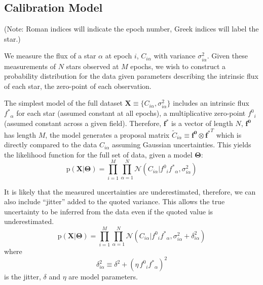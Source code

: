 \documentclass[12pt,preprint]{aastex}
\newcommand{\eqlabel}[1]{\label{eq:#1}}
\newcommand{\paramvector}[1]{\boldsymbol{#1}}
\newcommand{\bvec}[1]{\paramvector{#1}}
\newcommand{\normal}[3]{\mathcal{N} (#1 | #2, #3)}
\renewcommand{\Pr}{\mathrm{p}}
\newcommand{\model}     {\ensuremath{\paramvector{\Theta}} }
\newcommand{\data}      {\ensuremath{\mathbf{X}} }
\newcommand{\fstar}     {\ensuremath{f^*} }
\newcommand{\fzero}     {\ensuremath{f^0}}
\newcommand{\jabs}      {\ensuremath{\delta} }
\newcommand{\jrel}      {\ensuremath{\eta} }
\newcommand{\jitter}[1] {\ensuremath{\delta_{#1}^2} }
\begin{document}

\subsection{Calibration Model}

(Note: Roman indices will indicate the epoch number, Greek indices will
label the star.)

We measure the flux of a star $\alpha$ at epoch $i$, $C_{i\alpha}$ with
variance $\sigma_{i\alpha}^2$.  Given these measurements of $N$ stars observed
at $M$ epochs, we wish to construct a probability distribution for the data given
parameters describing the intrinsic flux of each star, the zero-point of each
observation.


The simplest model of the full dataset $\data \equiv \{ C_{i\alpha},
\sigma^2_{i\alpha} \}$ includes an intrinsic flux $\fstar_\alpha$ for
each star (assumed constant at all epochs), a multiplicative zero-point
$\fzero_i$ (assumed constant across a given field).  Therefore,
$\bvec{\fstar}$ is a vector of length $N$, $\bvec{\fzero}$ has
length $M$, the model generates a proposal matrix ${\tilde{C}_{i\alpha}}
\equiv \bvec{\fzero} \otimes \bvec{\fstar}^T$ which is directly
compared to the data $C_{i\alpha}$ assuming Gaussian uncertainties.  This
yields the likelihood function for the full set of data, given a model
$\model$:
\begin{equation}
    \Pr (\data | \model) = \prod_{i=1} ^{M}
        \prod_{\alpha=1} ^{N} \normal{C_{i\alpha}}{\fzero_i
        \fstar_\alpha}{\sigma_{i\alpha}^2}
\end{equation}

It is likely that the measured uncertainties are underestimated, therefore, we
can also include ``jitter'' added to the quoted variance.  This allows the true
uncertainty to be inferred from the data even if the quoted value is
underestimated.
\begin{equation} \eqlabel{calib-likelihood2}
    \Pr (\data | \model) = \prod_{i=1}^{M} \prod_{\alpha=1} ^{N}
        \normal{C_{i\alpha}}{\fzero_i
        \fstar_\alpha}{\sigma_{i\alpha}^2 + \jitter{i\alpha}}
\end{equation}
where
\begin{equation}
    \jitter{i\alpha} \equiv \jabs^2 + (\jrel \, \fzero_{i}
        \fstar_\alpha)^2
\end{equation}
is the jitter, $\jabs$ and $\jrel$ are model parameters.
\end{document}
